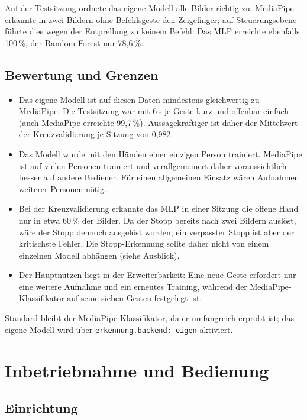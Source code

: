 \documentclass[11pt,a4paper]{article}
\begin{document}
Auf der Testsitzung ordnete das eigene Modell alle Bilder richtig zu. MediaPipe erkannte in zwei
Bildern ohne Befehlsgeste den Zeigefinger; auf Steuerungsebene führte dies wegen der Entprellung
zu keinem Befehl. Das MLP erreichte ebenfalls 100\,\%, der Random Forest nur 78,6\,\%.

\subsection{Bewertung und Grenzen}

\begin{itemize}
  \item Das eigene Modell ist auf diesen Daten mindestens gleichwertig zu MediaPipe. Die
        Testsitzung war mit 6\,s je Geste kurz und offenbar einfach (auch MediaPipe erreichte
        99,7\,\%). Aussagekräftiger ist daher der Mittelwert der Kreuzvalidierung je Sitzung von
        0,982.
  \item Das Modell wurde mit den Händen einer einzigen Person trainiert. MediaPipe ist auf vielen
        Personen trainiert und verallgemeinert daher voraussichtlich besser auf andere Bediener.
        Für einen allgemeinen Einsatz wären Aufnahmen weiterer Personen nötig.
  \item Bei der Kreuzvalidierung erkannte das MLP in einer Sitzung die offene Hand nur in etwa
        60\,\% der Bilder. Da der Stopp bereits nach zwei Bildern auslöst, wäre der Stopp dennoch
        ausgelöst worden; ein verpasster Stopp ist aber der kritischste Fehler. Die Stopp-Erkennung
        sollte daher nicht von einem einzelnen Modell abhängen (siehe Ausblick).
  \item Der Hauptnutzen liegt in der Erweiterbarkeit: Eine neue Geste erfordert nur eine weitere
        Aufnahme und ein erneutes Training, während der MediaPipe-Klassifikator auf seine sieben
        Gesten festgelegt ist.
\end{itemize}

Standard bleibt der MediaPipe-Klassifikator, da er umfangreich erprobt ist; das eigene Modell wird
über \texttt{erkennung.backend: eigen} aktiviert.

\section{Inbetriebnahme und Bedienung}

\subsection{Einrichtung}
\end{document}
